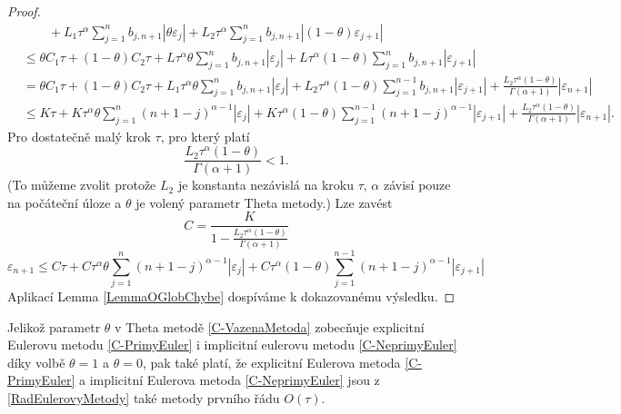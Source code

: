 \documentclass[a4paper,12pt,twoside]{article}
\theoremstyle{definition}
\theoremstyle{remark}
\numberwithin{equation}{section}
\numberwithin{table}{section}
\numberwithin{figure}{section}
\begin{document}
\begin{proof}
\begin{equation}
\begin{aligned}
			& \qquad + L_{1}\tau^{\alpha} \sum_{j = 1}^{n} 	b_{j,n+1}  | \theta \varepsilon_{j}| + L_{2}\tau^{\alpha} \sum_{j = 1}^{n} 	b_{j,n+1} |\left(1-\theta \right) \varepsilon_{j+1}| \\
			&\leq \theta C_{1} \tau + \left(1-\theta \right) C_{2} \tau + L \tau^{\alpha}\theta \sum_{j = 1}^{n} 	b_{j,n+1} | \varepsilon_{j}| + L \tau^{\alpha}\left(1-\theta \right) \sum_{j = 1}^{n} 	b_{j,n+1} | \varepsilon_{j+1}| \\
			& = \theta C_{1} \tau + \left(1-\theta \right) C_{2} \tau + L_{1} \tau^{\alpha}\theta \sum_{j = 1}^{n} 	b_{j,n+1} | \varepsilon_{j}| + L_{2} \tau^{\alpha}\left(1-\theta \right) \sum_{j = 1}^{n-1} 	b_{j,n+1} | \varepsilon_{j+1}| +  \frac{L_{2}\tau^{\alpha}\left(1-\theta\right)}{\Gamma\left(\alpha+1\right)} |\varepsilon_{n+1}|\\
			&\leq K \tau + K \tau^{\alpha}\theta \sum_{j = 1}^{n} 	\left(n+1-j\right)^{\alpha - 1} | \varepsilon_{j}| + K \tau^{\alpha}\left(1-\theta \right) \sum_{j = 1}^{n-1} 	\left(n+1-j\right)^{\alpha - 1} | \varepsilon_{j+1}| +\frac{L_{2}\tau^{\alpha}\left(1-\theta\right)}{\Gamma\left(\alpha+1\right)} |\varepsilon_{n+1}|.
		\end{aligned}	
	\end{equation}
	Pro dostatečně malý krok $\tau$, pro který platí
	\begin{equation}
		\frac{L_{2}\tau^{\alpha}\left(1-\theta\right)}{\Gamma\left(\alpha+1\right)} < 1.
	\end{equation}
	(To můžeme zvolit protože $L_{2}$ je konstanta nezávislá na kroku $\tau$, $\alpha$ závisí pouze na počáteční úloze a $\theta$  je volený parametr Theta metody.)
	Lze zavést
	$$C = \frac{K}{1 - \frac{L_{2}\tau^{\alpha}\left(1-\theta\right)}{ \Gamma\left(\alpha+1\right)}}$$
	\begin{equation}
		\varepsilon_{n+1} \leq C \tau + C \tau^{\alpha}\theta \sum_{j = 1}^{n} 	\left(n+1-j\right)^{\alpha - 1} | \varepsilon_{j}| + C \tau^{\alpha}\left(1-\theta \right) \sum_{j = 1}^{n-1} 	\left(n+1-j\right)^{\alpha - 1} | \varepsilon_{j+1}|
	\end{equation}
	Aplikací Lemma \ref{LemmaOGlobChybe} dospíváme k dokazovanému výsledku. 
\end{proof}

Jelikož parametr $\theta$ v Theta metodě \eqref{C-VazenaMetoda} zobecňuje explicitní Eulerovu metodu \eqref{C-PrimyEuler} i implicitní eulerovu metodu \eqref{C-NeprimyEuler} díky volbě $\theta = 1$ a $\theta = 0$, pak také platí, že explicitní Eulerova metoda \eqref{C-PrimyEuler} a implicitní Eulerova metoda \eqref{C-NeprimyEuler} jsou z \eqref{RadEulerovyMetody} také metody prvního řádu $O\left(\tau\right)$.
\end{document}
